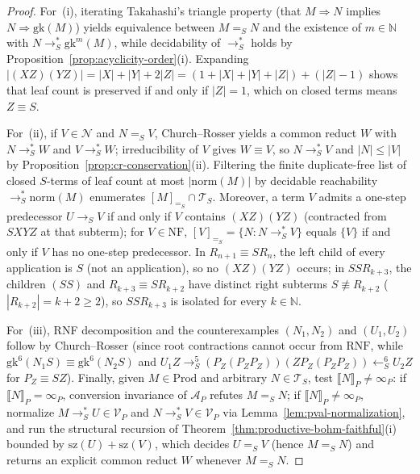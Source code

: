 \documentclass[11pt,reqno]{amsart}
\numberwithin{equation}{section}
\theoremstyle{plain}
\theoremstyle{definition}
\theoremstyle{remark}
\newcommand{\TS}{\mathcal{T}_S}
\newcommand{\NF}{\mathrm{NF}}
\newcommand{\RNF}{\mathrm{RNF}}
\newcommand{\Prod}{\mathrm{Prod}}
\newcommand{\sem}[1]{\llbracket #1 \rrbracket}
\newcommand{\redS}{\to_S}
\newcommand{\redSs}{\to_S^*}
\newcommand{\convS}{=_S}
\begin{document}
\begin{proof}
For~(i), iterating Takahashi's triangle property (that $M \Rightarrow N$ implies $N \Rightarrow \mathrm{gk}(M)$) yields equivalence between $M \convS N$ and the existence of $m \in \mathbb{N}$ with $N \redSs \mathrm{gk}^m(M)$, while decidability of $\redSs$ holds by Proposition~\ref{prop:acyclicity-order}(i). Expanding $|(X Z)(Y Z)| = |X| + |Y| + 2|Z| = (1 + |X| + |Y| + |Z|) + (|Z| - 1)$ shows that leaf count is preserved if and only if $|Z| = 1$, which on closed terms means $Z \equiv S$.

For~(ii), if $V \in \mathcal{N}$ and $N \convS V$, Church--Rosser yields a common reduct $W$ with $N \redSs W$ and $V \redSs W$; irreducibility of $V$ gives $W \equiv V$, so $N \redSs V$ and $|N| \le |V|$ by Proposition~\ref{prop:cr-conservation}(ii). Filtering the finite duplicate-free list of closed $S$-terms of leaf count at most $|\mathrm{norm}(M)|$ by decidable reachability $\redSs \mathrm{norm}(M)$ enumerates $[M]_{\convS} \cap \TS$. Moreover, a term $V$ admits a one-step predecessor $U \redS V$ if and only if $V$ contains $(X Z)(Y Z)$ (contracted from $S X Y Z$ at that subterm); for $V \in \NF$, $[V]_{\convS} = \{N : N \redSs V\}$ equals $\{V\}$ if and only if $V$ has no one-step predecessor. In $R_{n+1} \equiv S R_n$, the left child of every application is $S$ (not an application), so no $(X Z)(Y Z)$ occurs; in $S S R_{k+3}$, the children $(S S)$ and $R_{k+3} \equiv S R_{k+2}$ have distinct right subterms $S \not\equiv R_{k+2}$ ($|R_{k+2}| = k + 2 \ge 2$), so $S S R_{k+3}$ is isolated for every $k \in \mathbb{N}$.

For~(iii), RNF decomposition and the counterexamples $(N_1, N_2)$ and $(U_1, U_2)$ follow by Church--Rosser (since root contractions cannot occur from $\RNF$, while $\mathrm{gk}^6(N_1 S) \equiv \mathrm{gk}^6(N_2 S)$ and $U_1 Z \redS^5 (P_Z(P_Z P_Z))(Z P_Z(P_Z P_Z)) \leftarrow_S^6 U_2 Z$ for $P_Z \equiv S Z$). Finally, given $M \in \Prod$ and arbitrary $N \in \TS$, test $\sem{N}_P \neq \infty_P$: if $\sem{N}_P = \infty_P$, conversion invariance of $\mathcal{A}_P$ refutes $M \convS N$; if $\sem{N}_P \neq \infty_P$, normalize $M \redSs U \in \mathcal{V}_P$ and $N \redSs V \in \mathcal{V}_P$ via Lemma~\ref{lem:pval-normalization}, and run the structural recursion of Theorem~\ref{thm:productive-bohm-faithful}(i) bounded by $\mathrm{sz}(U) + \mathrm{sz}(V)$, which decides $U \convS V$ (hence $M \convS N$) and returns an explicit common reduct $W$ whenever $M \convS N$.
\end{proof}
\end{document}
